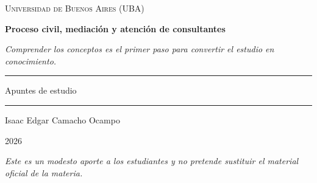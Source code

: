 \documentclass[12pt,oneside]{book}
\newcommand{\universidad}{Universidad de Buenos Aires (UBA)}
\newcommand{\titulo}{Proceso civil, mediaci\'on y atenci\'on de consultantes}
\newcommand{\autor}{Isaac Edgar Camacho Ocampo}
\newcommand{\anio}{2026}
\begin{document}
\begin{titlepage}

\thispagestyle{empty}

\begin{center}

\vspace*{1cm}

{\large \textsc{\universidad}}

\vspace{3.5cm}

{\Huge \textbf{\titulo}}

\vspace{1cm}

\textit{Comprender los conceptos es el primer paso para convertir el estudio en conocimiento.}

\vspace{1.2cm}

\rule{0.70\textwidth}{0.5pt}

\vspace{0.5cm}

{\large Apuntes de estudio}

\vspace{0.5cm}

\rule{0.70\textwidth}{0.5pt}

\vfill

{\large \autor}

\vspace{0.3cm}

{\large \anio}

\end{center}

\vfill

\begin{flushleft}
\textit{Este es un modesto aporte a los estudiantes y no pretende sustituir el material oficial de la materia.}
\end{flushleft}

\end{titlepage}

\tableofcontents


\end{document}
